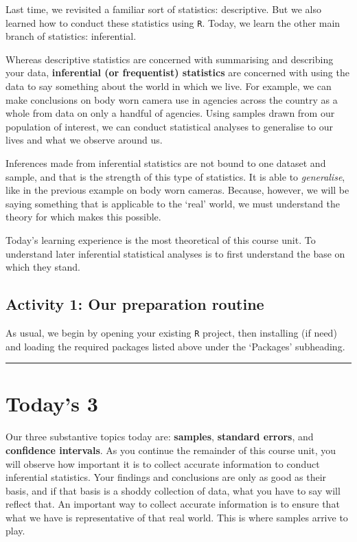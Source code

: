 \documentclass[
]{book}
\begin{document}
Last time, we revisited a familiar sort of statistics: descriptive. But we also learned how to conduct these statistics using \texttt{R}. Today, we learn the other main branch of statistics: inferential.

Whereas descriptive statistics are concerned with summarising and describing your data, \textbf{inferential (or frequentist) statistics} are concerned with using the data to say something about the world in which we live. For example, we can make conclusions on body worn camera use in agencies across the country as a whole from data on only a handful of agencies. Using samples drawn from our population of interest, we can conduct statistical analyses to generalise to our lives and what we observe around us.

Inferences made from inferential statistics are not bound to one dataset and sample, and that is the strength of this type of statistics. It is able to \emph{generalise}, like in the previous example on body worn cameras. Because, however, we will be saying something that is applicable to the `real' world, we must understand the theory for which makes this possible.

Today's learning experience is the most theoretical of this course unit. To understand later inferential statistical analyses is to first understand the base on which they stand.

\hypertarget{activity-1-our-preparation-routine-1}{%
\subsection{Activity 1: Our preparation routine}\label{activity-1-our-preparation-routine-1}}

As usual, we begin by opening your existing \texttt{R} project, then installing (if need) and loading the required packages listed above under the `Packages' subheading.

\begin{center}\rule{0.5\linewidth}{0.5pt}\end{center}

\hypertarget{todays-3-2}{%
\section{Today's 3}\label{todays-3-2}}

Our three substantive topics today are: \textbf{samples}, \textbf{standard errors}, and \textbf{confidence intervals}. As you continue the remainder of this course unit, you will observe how important it is to collect accurate information to conduct inferential statistics. Your findings and conclusions are only as good as their basis, and if that basis is a shoddy collection of data, what you have to say will reflect that. An important way to collect accurate information is to ensure that what we have is representative of that real world. This is where samples arrive to play.
\end{document}
